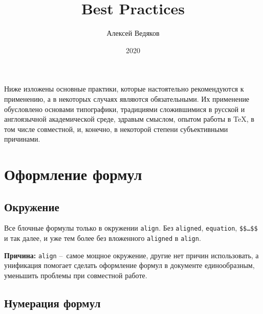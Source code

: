 \documentclass[12pt, a4paper]{article}
\title{{\LaTeXe} Best Practices}
\author{Алексей Ведяков}
\date{2020}
\begin{document}
\maketitle
 
Ниже изложены основные практики, которые настоятельно рекомендуются к
применению, а в некоторых случаях являются обязательными. Их применение
обусловлено основами типографики, традициями сложившимися в русской и
англоязычной академической среде, здравым смыслом, опытом работы в TeX, в том числе совместной, и, конечно, в некоторой степени субъективными причинами.

\section{Оформление формул}

\subsection{Окружение}

Все блочные формулы только в окружении \texttt{align}. Без
\texttt{aligned}, \texttt{equation}, \texttt{\$\$\ldots\$\$} и так далее, и уже
тем более без вложенного \texttt{aligned} в \texttt{align}.

\textbf{Причина:} \texttt{align} --~самое мощное окружение, другие нет
причин использовать, а унификация помогает сделать оформление формул в
документе единообразным, уменьшить проблемы при совместной работе.

\subsection{Нумерация формул}
\end{document}
